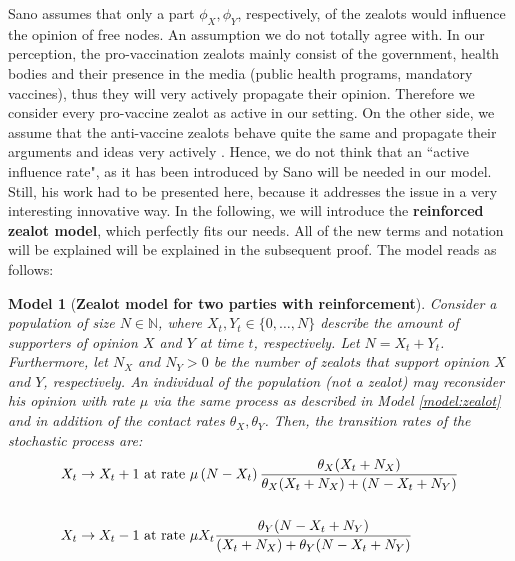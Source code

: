 \documentclass[12pt,a4paper,twoside]{article}
\newtheorem{model}{Model}[section]
\begin{document}
Sano assumes that only a part $\phi_X, \phi_Y$, respectively, of the zealots would influence the opinion of free nodes. An assumption we do not totally agree with. In our perception, the pro-vaccination zealots mainly consist of the government, health bodies and their presence in the media (public health programs, mandatory vaccines), thus they will very actively propagate their opinion. Therefore we consider every pro-vaccine zealot as active in our setting. On the other side, we assume that the anti-vaccine zealots behave quite the same and propagate their arguments and ideas very actively \cite{Davies2002, Meyer2004}. Hence, we do not think that an ``active influence rate", as it has been introduced by Sano will be needed in our model. Still, his work had to be presented here, because it addresses the issue in a very interesting innovative way. In the following, we will introduce the \textbf{reinforced zealot model}, which perfectly fits our needs. All of the new terms and notation will be explained will be explained in the subsequent proof. The model reads as follows:
\begin{model}[\textbf{Zealot model for two parties with reinforcement}]\label{model:zealot_reinforcement}%
	Consider a population of size $N \in \mathbb{N}$, where $X_t, Y_t \in \lbrace 0,\dots, N\rbrace$ describe the amount of supporters of opinion $X$ and $Y$ at time $t$, respectively. Let $N = X_t + Y_t$. Furthermore, let $N_X$ and $N_Y > 0$ be the number of zealots that support opinion $X$ and $Y$, respectively. An individual of the population (not a zealot) may reconsider his opinion with rate $\mu$ via the same process as described in Model \ref{model:zealot} and in addition of the contact rates $\theta_X, \theta_Y$. Then, the transition rates of the stochastic process are:
	\begin{align}\label{def:transition_rates_zealot_reinforcement}
	\begin{split}
	X_t \rightarrow X_t + 1 & \textnormal{ at rate } \mu\left(N-X_t\right)\frac{\theta_X (X_t + N_X)}{\theta_X (X_t + N_X) + (N - X_t + N_Y)} \\
	&\\
	X_t \rightarrow X_t - 1 & \textnormal{ at rate } \mu X_t\frac{\theta_Y(N-X_t+N_Y)}{(X_t + N_X) + \theta_Y(N-X_t+N_Y)}
	\end{split}
	\end{align}
\end{model}
\end{document}
